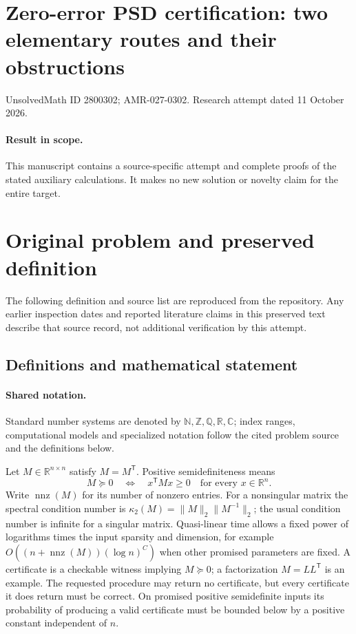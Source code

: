 \documentclass[11pt]{article}
\begin{document}
\section*{Zero-error PSD certification: two elementary routes and their obstructions}
\noindent UnsolvedMath ID 2800302; AMR-027-0302. Research attempt dated 11 October 2026.
\paragraph{Result in scope.}This manuscript contains a source-specific attempt and complete proofs of the stated auxiliary calculations. It makes no new solution or novelty claim for the entire target.
\section{Original problem and preserved definition}
The following definition and source list are reproduced from the repository. Any earlier inspection dates and reported literature claims in this preserved text describe that source record, not additional verification by this attempt.
\subsection{Definitions and mathematical statement}

\paragraph{Shared notation.}Standard number systems are denoted by $\mathbb N,\mathbb Z,\mathbb Q,\mathbb R,\mathbb C$; index ranges, computational models and specialized notation follow the cited problem source and the definitions below.


Let $M\in\mathbb{R}^{n\times n}$ satisfy $M=M^{\mathsf T}$. Positive semidefiniteness means
\[
 M\succeq0\quad\Longleftrightarrow\quad x^{\mathsf T}Mx\ge0\quad\text{for every }x\in\mathbb{R}^n.
\]
Write $\operatorname{nnz}(M)$ for its number of nonzero entries. For a nonsingular matrix the spectral condition number is $\kappa_2(M)=\|M\|_2\|M^{-1}\|_2$; the usual condition number is infinite for a singular matrix. Quasi-linear time allows a fixed power of logarithms times the input sparsity and dimension, for example $O((n+\operatorname{nnz}(M))(\log n)^C)$ when other promised parameters are fixed. A certificate is a checkable witness implying $M\succeq0$; a factorization $M=LL^{\mathsf T}$ is an example. The requested procedure may return no certificate, but every certificate it does return must be correct. On promised positive semidefinite inputs its probability of producing a valid certificate must be bounded below by a positive constant independent of $n$.
\end{document}
